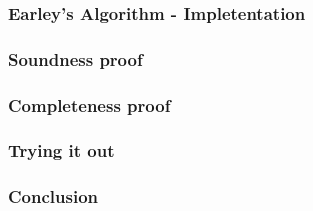 %
%
%
%

\begin{frame}
	\frametitle{Earley's Algorithm - Impletentation}
\end{frame}

\begin{frame}
	\frametitle{Soundness proof}
\end{frame}

\begin{frame}
	\frametitle{Completeness proof}
\end{frame}

\begin{frame}
	\frametitle{Trying it out}
\end{frame}

\begin{frame}
	\frametitle{Conclusion}
\end{frame}
